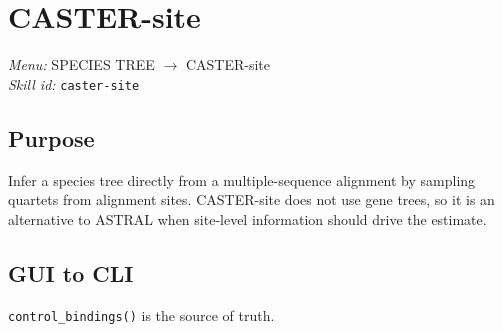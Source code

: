 \documentclass[11pt]{report}
\begin{document}
\section{CASTER-site}
\noindent\textit{Menu:} SPECIES TREE $\rightarrow$ CASTER-site\\
\noindent\textit{Skill id:} \texttt{caster-site}

\subsection{Purpose}

Infer a species tree directly from a multiple-sequence alignment by sampling quartets from alignment sites. CASTER-site does not use gene trees, so it is an alternative to ASTRAL when site-level information should drive the estimate.

\subsection{GUI to CLI}

\texttt{control\_\allowbreak bindings\allowbreak ()} is the source of truth.
\end{document}
